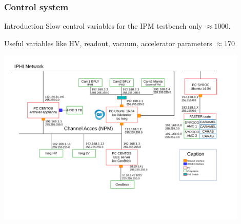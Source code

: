 \begin{frame}[t]
  \frametitle{Control system}
  \begin{block}{Introduction}
    Slow control variables for the IPM testbench only $\approx 1000$.

    Useful variables like HV, readout, vacuum, accelerator parameters $\approx 170$
  \end{block}
  \centering
  \includegraphics[width=0.9\textwidth]{06_Backup/fig/fig000_EPICS_IPHI.pdf}

\end{frame}